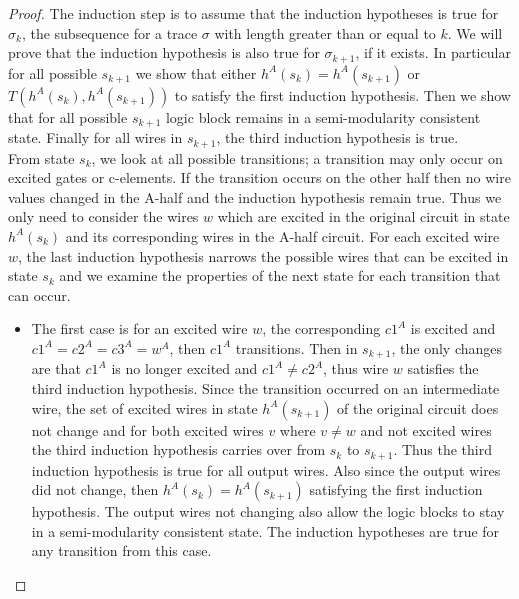 \documentclass[12pt]{report}
\begin{document}
\begin{proof}
The induction step is to assume that the induction hypotheses is true for $\sigma_k$, the subsequence for a trace $\sigma$ with length greater than or equal to $k$.  We will prove that the induction hypothesis is also true for $\sigma_{k+1}$, if it exists.  In particular for all possible $s_{k+1}$ we show that either $h^A(s_{k})=h^A(s_{k+1})$ or $T(h^A(s_{k}),h^A(s_{k+1}))$ to satisfy the first induction hypothesis.  Then we show that for all possible $s_{k+1}$ logic block remains in a semi-modularity consistent state.  Finally for all wires in $s_{k+1}$, the third induction hypothesis is true.\\

From state $s_k$, we look at all possible transitions; a transition may only occur on excited gates or c-elements.  If the transition occurs on the other half then no wire values changed in the A-half and the induction hypothesis remain true.  Thus we only need to consider the wires $w$ which are excited in the original circuit in state $h^A(s_k)$ and its corresponding wires in the A-half circuit.  For each excited wire $w$, the last induction hypothesis narrows the possible wires that can be excited in state $s_k$ and we examine the properties of the next state for each transition that can occur. %
\begin{itemize}
\item The first case is for an excited wire $w$, the corresponding $c1^A$ is excited and $c1^A=c2^A=c3^A=w^A$, then $c1^A$ transitions.  Then in $s_{k+1}$, the only changes are that $c1^A$ is no longer excited and $c1^A\neq c2^A$, thus wire $w$ satisfies the third induction hypothesis.  Since the transition occurred on an intermediate wire, the set of excited wires in state $h^A(s_{k+1})$ of the original circuit does not change and for both excited wires $v$ where $v\neq w$ and not excited wires the third induction hypothesis carries over from $s_k$ to $s_{k+1}$.  Thus the third induction hypothesis is true for all output wires.  Also since the output wires did not change, then $h^A(s_k)=h^A(s_{k+1})$ satisfying the first induction hypothesis.  The output wires not changing also allow the logic blocks to stay in a semi-modularity consistent state.   The induction hypotheses are true for any transition from this case.  %

\end{itemize}
\end{proof}
\end{document}
